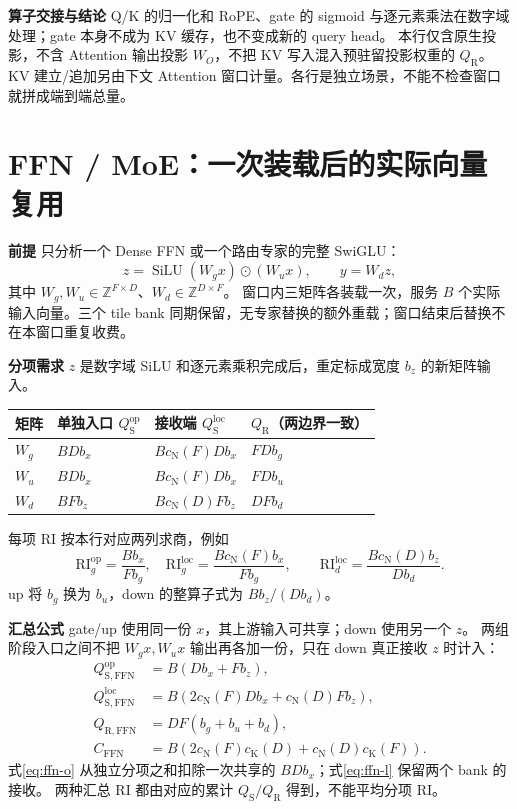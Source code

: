 \documentclass[11pt,a4paper,fontset=fandol]{ctexart}
\newcommand{\RI}{\mathrm{RI}}
\newcommand{\op}{\mathrm{op}}
\newcommand{\loc}{\mathrm{loc}}
\newcommand{\cn}[1]{c_{\mathrm N}\!\left(#1\right)}
\newcommand{\ck}[1]{c_{\mathrm K}\!\left(#1\right)}
\newcommand{\qs}{Q_{\mathrm S}}
\newcommand{\qr}{Q_{\mathrm R}}
\newcommand{\para}[1]{\par\smallskip\noindent\textbf{#1}\quad}
\begin{document}
\para{算子交接与结论}
Q/K 的归一化和 RoPE、gate 的 sigmoid 与逐元素乘法在数字域处理；gate 本身不成为 KV 缓存，也不变成新的 query head。
本行仅含原生投影，不含 Attention 输出投影 $W_O$，不把 KV 写入混入预驻留投影权重的 $\qr$。
KV 建立/追加另由下文 Attention 窗口计量。各行是独立场景，不能不检查窗口就拼成端到端总量。

\clearpage
\section{FFN / MoE：一次装载后的实际向量复用}
\para{前提}
只分析一个 Dense FFN 或一个路由专家的完整 SwiGLU：
\begin{equation}
z=\operatorname{SiLU}(W_gx)\odot(W_ux),\qquad y=W_dz,
\end{equation}
其中 $W_g,W_u\in\mathbb Z^{F\times D}$、$W_d\in\mathbb Z^{D\times F}$\cite{glu,models}。
窗口内三矩阵各装载一次，服务 $B$ 个实际输入向量。三个 tile bank 同期保留，无专家替换的额外重载；窗口结束后替换不在本窗口重复收费。

\para{分项需求}
$z$ 是数字域 SiLU 和逐元素乘积完成后，重定标成宽度 $b_z$ 的新矩阵输入。
\begin{center}\small
\begin{tabular}{@{}llll@{}}\toprule
矩阵 & 单独入口 $\qs^\op$ & 接收端 $\qs^\loc$ & $\qr$（两边界一致）\\\midrule
$W_g$ & $BDb_x$ & $B\cn{F}Db_x$ & $FDb_g$\\
$W_u$ & $BDb_x$ & $B\cn{F}Db_x$ & $FDb_u$\\
$W_d$ & $BFb_z$ & $B\cn{D}Fb_z$ & $DFb_d$\\\bottomrule
\end{tabular}\end{center}
每项 RI 按本行对应两列求商，例如
\begin{equation}
\RI_g^\op=\frac{Bb_x}{Fb_g},\quad
\RI_g^\loc=\frac{B\cn{F}b_x}{Fb_g},\qquad
\RI_d^\loc=\frac{B\cn{D}b_z}{Db_d}.
\end{equation}
up 将 $b_g$ 换为 $b_u$，down 的整算子式为 $Bb_z/(Db_d)$。

\para{汇总公式}
gate/up 使用同一份 $x$，其上游输入可共享；down 使用另一个 $z$。
两组阶段入口之间不把 $W_gx,W_ux$ 输出再各加一份，只在 down 真正接收 $z$ 时计入：
\begin{align}
Q_{\mathrm{S,FFN}}^{\op}&=B(Db_x+Fb_z),\label{eq:ffn-o}\\
Q_{\mathrm{S,FFN}}^{\loc}&=B\left(2\cn{F}Db_x+\cn{D}Fb_z\right),\label{eq:ffn-l}\\
Q_{\mathrm{R,FFN}}&=DF(b_g+b_u+b_d),\label{eq:ffn-r}\\
C_{\mathrm{FFN}}&=B\left(2\cn{F}\ck{D}+\cn{D}\ck{F}\right).
\end{align}
式\eqref{eq:ffn-o} 从独立分项之和扣除一次共享的 $BDb_x$；式\eqref{eq:ffn-l} 保留两个 bank 的接收。
两种汇总 RI 都由对应的累计 $\qs/\qr$ 得到，不能平均分项 RI。
\end{document}

